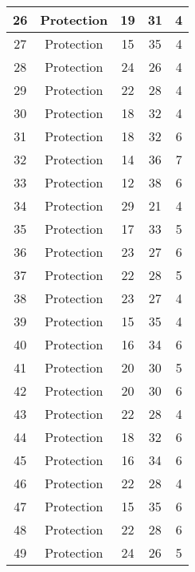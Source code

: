 \documentclass[results.tex]{subfiles}
\begin{document}
\begin{center}
\begin{tabular}{| c || c | c | c | c |}
    \hline
    26 & Protection & 19 & 31 & 4 \\ 
    \hline
    27 & Protection & 15 & 35 & 4 \\ 
    \hline
    28 & Protection & 24 & 26 & 4 \\ 
    \hline
    29 & Protection & 22 & 28 & 4 \\ 
    \hline
    30 & Protection & 18 & 32 & 4 \\ 
    \hline
    31 & Protection & 18 & 32 & 6 \\ 
    \hline
    32 & Protection & 14 & 36 & 7 \\ 
    \hline
    33 & Protection & 12 & 38 & 6 \\ 
    \hline
    34 & Protection & 29 & 21 & 4 \\ 
    \hline
    35 & Protection & 17 & 33 & 5 \\ 
    \hline
    36 & Protection & 23 & 27 & 6 \\ 
    \hline
    37 & Protection & 22 & 28 & 5 \\ 
    \hline
    38 & Protection & 23 & 27 & 4 \\ 
    \hline
    39 & Protection & 15 & 35 & 4 \\ 
    \hline
    40 & Protection & 16 & 34 & 6 \\ 
    \hline
    41 & Protection & 20 & 30 & 5 \\ 
    \hline
    42 & Protection & 20 & 30 & 6 \\ 
    \hline
    43 & Protection & 22 & 28 & 4 \\ 
    \hline
    44 & Protection & 18 & 32 & 6 \\ 
    \hline
    45 & Protection & 16 & 34 & 6 \\ 
    \hline
    46 & Protection & 22 & 28 & 4 \\ 
    \hline
    47 & Protection & 15 & 35 & 6 \\ 
    \hline
    48 & Protection & 22 & 28 & 6 \\ 
    \hline
    49 & Protection & 24 & 26 & 5 \\ 
    \hline   \end{tabular}
\end{center}
\end{document}
